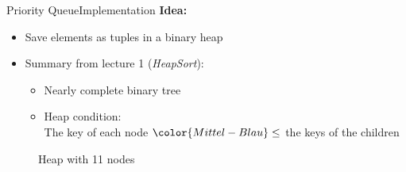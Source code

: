 \begin{frame}{Priority Queue}{Implementation}
  \textbf{Idea:}
  \begin{itemize}
    \item<2->
      Save elements as tuples in a binary heap
    \item<3->
      Summary from lecture 1 (\textit{HeapSort}):
    \begin{itemize}
      \item<3->
        Nearly complete binary tree
      \item<3->
        {\color{Mittel-Blau}Heap condition}:\\
        The key of each node ${\color{Mittel-Blau}\leq}$ the keys of the
        children\\
    \end{itemize}
  \end{itemize}
  \vspace{-0.5em}
  \begin{figure}[!h]
    \begin{adjustbox}{height=0.3\linewidth}
    \end{adjustbox}
    \vspace{-0.75em}
    \caption{Heap with 11 nodes}%
    \label{fig:priority_queue:impl_heap}%
  \end{figure}
\end{frame}


